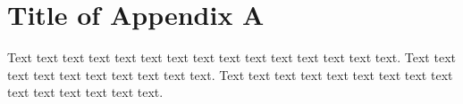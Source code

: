 \chapter{Title of Appendix A}

Text text text text text text text text text text text text text text text. Text text text text text text text text text text.
Text text text text text text text text text text text text text text text.





